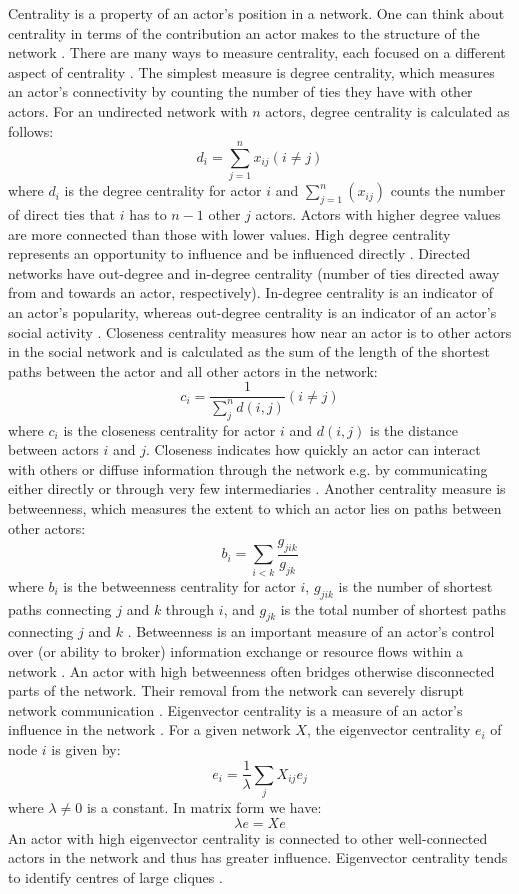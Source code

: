 Centrality is a property of an actor's position in a network. One can think about centrality in terms of the contribution an actor makes to the structure of the network \citep{borgatti2013analyzing}. There are many ways to measure centrality, each focused on a different aspect of centrality \citep{freeman1979centrality}. The simplest measure is degree centrality, which measures an actor's connectivity by counting the number of ties they have with other actors. For an undirected network with \(n\) actors, degree centrality is calculated as follows: $$ d_i=\sum_{j=1}^{n}x_{ij}(i \neq j) $$ where $d_i$ is the degree centrality for actor $i$ and $\sum_{j=1}^{n}(x_{ij})$ counts the number of direct ties that $i$ has to $n-1$ other $j$ actors. Actors with higher degree values are more connected than those with lower values. High degree centrality represents an opportunity to influence and be influenced directly \citep{borgatti2013analyzing}. Directed networks have out-degree and in-degree centrality (number of ties directed away from and towards an actor, respectively). In-degree centrality is an indicator of an actor's popularity, whereas out-degree centrality is an indicator of an actor's social activity \citep{robins2015doing}. Closeness centrality measures how near an actor is to other actors in the social network and is calculated as the sum of the length of the shortest paths between the actor and all other actors in the network: $$c_i=\frac{1}{\sum_{j}^{n}d(i,j)}(i \neq j)$$ where $c_i$ is the closeness centrality for actor $i$ and $d(i,j)$ is the distance between actors $i$ and $j$. Closeness indicates how quickly an actor can interact with others or diffuse information through the network e.g. by communicating either directly or through very few intermediaries \citep{bavelas1950communication,freeman1979centrality,knoke2008social}. Another centrality measure is betweenness, which measures the extent to which an actor lies on paths between other actors: $$ b_i=\sum_{i < k}\frac{g_{jik}}{g_{jk}} $$ where $b_i$ is the betweenness centrality for actor $i$, $g_{jik}$ is the number of shortest paths connecting $j$ and $k$ through $i$, and $g_{jk}$ is the total number of shortest paths connecting $j$ and $k$ \citep{freeman1979centrality}. Betweenness is an important measure of an actor's control over (or ability to broker) information exchange or resource flows within a network \citep{knoke2008social,everett2016bridging}. An actor with high betweenness often bridges otherwise disconnected parts of the network. Their removal from the network can severely disrupt network communication \citep{borgatti2013analyzing}. Eigenvector centrality is a measure of an actor's influence in the network \citep{bonacich1987power}. For a given network $X$, the eigenvector centrality $e_{i}$ of node $i$ is given by: $$e_i = \frac{1}{\lambda} \sum_j X_{ij}e_j$$ where $\lambda \neq 0$ is a constant. In matrix form we have: $$\lambda e = Xe$$ An actor with high eigenvector centrality is connected to other well-connected actors in the network and thus has greater influence. Eigenvector centrality tends to identify centres of large cliques \citep{borgatti2013analyzing}. \medskip

